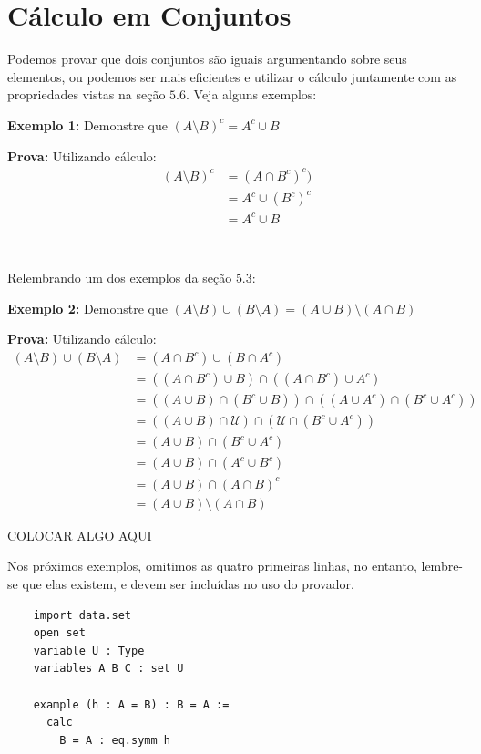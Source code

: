 \section{Cálculo em Conjuntos}
Podemos provar que dois conjuntos são iguais argumentando sobre seus elementos, ou podemos ser mais eficientes e utilizar o cálculo juntamente com as propriedades vistas na seção $5.6$. Veja alguns exemplos:

\textbf{Exemplo 1:} Demonstre que $(A \setminus B)^c = A^c \cup B$

\textbf{Prova:} Utilizando cálculo:
\begin{equation*}
\begin{aligned}
  (A \setminus B)^c &= (A \cap B^c)^c)\\
  &= A^c \cup (B^c)^c\\
  & = A^c \cup B
\end{aligned}
\end{equation*}

$\qquad$

Relembrando um dos exemplos da seção $5.3$:

\textbf{Exemplo 2:} Demonstre que $(A \setminus B) \cup (B \setminus A) = (A \cup B) \setminus (A \cap B)$

\textbf{Prova:} Utilizando cálculo:
\begin{equation*}
\begin{aligned}
  (A \setminus B) \cup (B \setminus A) &= (A \cap B^c) \cup (B \cap A^c)\\
  &= ((A \cap B^c) \cup B) \cap ((A \cap B^c) \cup A^c)\\
  &= ((A \cup B) \cap (B^c \cup B)) \cap ((A \cup A^c) \cap (B^c \cup A^c))\\
  &= ((A \cup B) \cap \mathcal U) \cap (\mathcal U \cap (B^c \cup A^c))\\
  &= (A \cup B) \cap (B^c \cup A^c)\\
  &= (A \cup B) \cap (A^c \cup B^c)\\
  &= (A \cup B) \cap (A \cap B)^c\\
  &= (A \cup B) \setminus (A \cap B)
\end{aligned}
\end{equation*}

COLOCAR ALGO AQUI

Nos próximos exemplos, omitimos as quatro primeiras linhas, no entanto, lembre-se que elas existem, e devem ser incluídas no uso do provador.

\begin{lstlisting}
    import data.set
    open set
    variable U : Type
    variables A B C : set U

    example (h : A = B) : B = A :=
      calc
        B = A : eq.symm h
\end{lstlisting}

